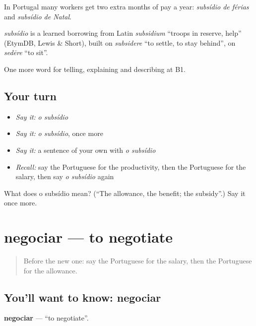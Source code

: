 In Portugal many workers get two extra months of pay a year: \emph{subsídio de férias} and \emph{subsídio de Natal}.

\begin{cousinweb}
\emph{subsídio} is a learned borrowing from Latin \emph{subsidium} \textquotedblleft{}troops in reserve, help\textquotedblright{} (EtymDB, Lewis \& Short), built on \emph{subsidere} \textquotedblleft{}to settle, to stay behind\textquotedblright{}, on \emph{sedēre} \textquotedblleft{}to sit\textquotedblright{}.
\end{cousinweb}

\begin{grammarlens}[title={What you've built}]
One more word for telling, explaining and describing at B1.
\end{grammarlens}

\subsection*{Your turn}
\begin{itemize}
\raggedright
  \item \emph{Say it:} \emph{o subsídio}
  \item \emph{Say it:} \emph{o subsídio}, once more
  \item \emph{Say it:} a sentence of your own with \emph{o subsídio}
  \item \emph{Recall:} say the Portuguese for the productivity, then the Portuguese for the salary, then say \emph{o subsídio} again
\end{itemize}

\begin{tcolorbox}[breakable,colback=teal!4,colframe=teal!35!black,title={Before you move on}]
What does o subsídio mean? (\textquotedblleft{}The allowance, the benefit; the subsidy\textquotedblright{}.) Say it once more.
\end{tcolorbox}
\section[negociar]{negociar — to negotiate}

\label{lesson:PT-C362-negociar}



\begin{quote}
Before the new one: say the Portuguese for the salary, then the Portuguese for the allowance.
\end{quote}

\subsection*{You'll want to know: negociar}
\textbf{negociar} — \textquotedblleft{}to negotiate\textquotedblright{}.

